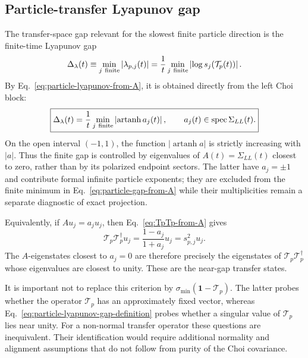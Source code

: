 \documentclass[aps,prb,onecolumn,nofootinbib,superscriptaddress]{revtex4-2}
\newcommand{\I}{\mathbf{1}}
\theoremstyle{plain}
\theoremstyle{definition}
\begin{document}
\subsection{Particle-transfer Lyapunov gap}

The transfer-space gap relevant for the slowest finite particle direction is
the finite-time Lyapunov gap
\begin{equation}
  \Delta_\lambda(t)
  \equiv
  \min_{j\ {\rm finite}}\left|\lambda_{p,j}(t)\right|
  =
  \frac{1}{t}
  \min_{j\ {\rm finite}}
  \left|\log s_j\!\left(\mathcal T_p(t)\right)\right| .
  \label{eq:particle-lyapunov-gap-definition}
\end{equation}
By Eq.~\eqref{eq:particle-lyapunov-from-A}, it is obtained directly from the
left Choi block:
\begin{equation}
  \boxed{
  \Delta_\lambda(t)
  =
  \frac{1}{t}
  \min_{j\ {\rm finite}}
  \left|
    \operatorname{artanh} a_j(t)
  \right|,
  \qquad
  a_j(t)\in\operatorname{spec}\Sigma_{LL}(t).
  }
  \label{eq:particle-gap-from-A}
\end{equation}
On the open interval \((-1,1)\), the function
\(\left|\operatorname{artanh}a\right|\) is strictly increasing with
\(\lvert a\rvert\).  Thus the finite gap is controlled by eigenvalues of
\(A(t)=\Sigma_{LL}(t)\) closest to zero, rather than by its polarized
endpoint sectors.  The latter have \(a_j=\pm1\) and contribute formal
infinite particle exponents; they are excluded from the finite minimum in
Eq.~\eqref{eq:particle-gap-from-A} while their multiplicities remain a
separate diagnostic of exact projection.

Equivalently, if \(A u_j=a_j u_j\), then
Eq.~\eqref{eq:TpTp-from-A} gives
\begin{equation}
  \mathcal T_p\mathcal T_p^\dagger u_j
  =
  \frac{1-a_j}{1+a_j}u_j
  =
  s_{p,j}^2 u_j.
  \label{eq:near-gap-transfer-eigenstates}
\end{equation}
The \(A\)-eigenstates closest to \(a_j=0\) are therefore precisely the
eigenstates of \(\mathcal T_p\mathcal T_p^\dagger\) whose eigenvalues are
closest to unity.  These are the near-gap transfer states.

It is important not to replace this criterion by
\(\sigma_{\min}(\I-\mathcal T_p)\).  The latter probes whether the operator
\(\mathcal T_p\) has an approximately fixed vector, whereas
Eq.~\eqref{eq:particle-lyapunov-gap-definition} probes whether a singular
value of \(\mathcal T_p\) lies near unity.  For a non-normal transfer
operator these questions are inequivalent.  Their identification would
require additional normality and alignment assumptions that do not follow
from purity of the Choi covariance.
\end{document}
